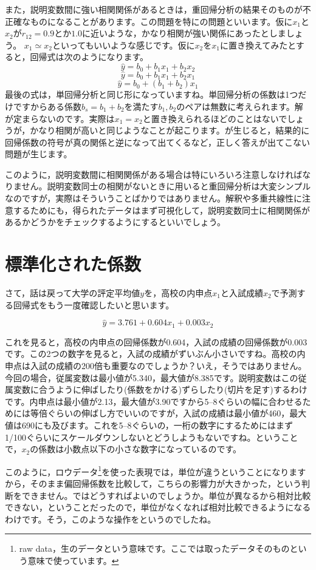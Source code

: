 \documentclass{ltjbook}
\begin{document}
また，説明変数間に強い相関関係があるときは，重回帰分析の結果そのものが不正確なものになることがあります。この問題を特にの問題といいます。仮に$x_1$と$x_2$が$r_{12}=0.9$とか$1.0$に近いような，かなり相関が強い関係にあったとしましょう。
$x_1 \simeq x_2$といってもいいような感じです。仮に$x_2$を$x_1$に置き換えてみたとすると，回帰式は次のようになります。
\[ \hat{y} = b_0 + b_1 x_1 + b_2x_2 \]
\[ \hat{y} = b_0 + b_1 x_1 + b_2x_1 \]
\[ \hat{y} = b_0 + (b_1+b_2) x_1 \]
最後の式は，単回帰分析と同じ形になっていますね。単回帰分析の係数は1つだけですからある係数$b_s = b_1 + b_2$を満たす$b_1,b_2$のペアは無数に考えられます。解が定まらないのです。実際は$x_1=x_2$と置き換えられるほどのことはないでしょうが，かなり相関が高いと同じようなことが起こります。が生じると，結果的に回帰係数の符号が真の関係と逆になって出てくるなど，正しく答えが出てこない問題が生じます。

このように，説明変数間に相関関係がある場合は特にいろいろ注意しなければなりません。説明変数同士の相関がないときに用いると重回帰分析は大変シンプルなのですが，実際はそういうことばかりではありません。解釈や多重共線性に注意するためにも，得られたデータはまず可視化して，説明変数同士に相関関係があるかどうかをチェックするようにするといいでしょう。


\section{標準化された係数}

さて，話は戻って大学の評定平均値$y$を，高校の内申点$x_1$と入試成績$x_2$で予測する回帰式をもう一度確認したいと思います。

\[ \hat{y} = 3.761+0.604x_1+0.003x_2 \]

これを見ると，高校の内申点の回帰係数が0.604，入試の成績の回帰係数が0.003です。この2つの数字を見ると，入試の成績がずいぶん小さいですね。高校の内申点は入試の成績の200倍も重要なのでしょうか？いえ，そうではありません。今回の場合，従属変数は最小値が5.340，最大値が8.385です。説明変数はこの従属変数に合うように伸ばしたり(係数をかける)ずらしたり(切片を足す)するわけです。内申点は最小値が2.13，最大値が3.90ですから5--8ぐらいの幅に合わせるためには等倍ぐらいの伸ばし方でいいのですが，入試の成績は最小値が460，最大値は690にも及びます。これを5--8ぐらいの，一桁の数字にするためにはまず1/100ぐらいにスケールダウンしないとどうしようもないですね。ということで，$x_2$の係数は小数点以下の小さな数字になっているのです。

このように，ロウデータ\footnote{raw data，生のデータという意味です。ここでは取ったデータそのものという意味で使っています。}を使った表現では，単位が違うということになりますから，そのまま偏回帰係数を比較して，こちらの影響力が大きかった，という判断をできません。ではどうすればよいのでしょうか。単位が異なるから相対比較できない，ということだったので，単位がなくなれば相対比較できるようになるわけです。そう，このような操作をというのでしたね。
\end{document}
